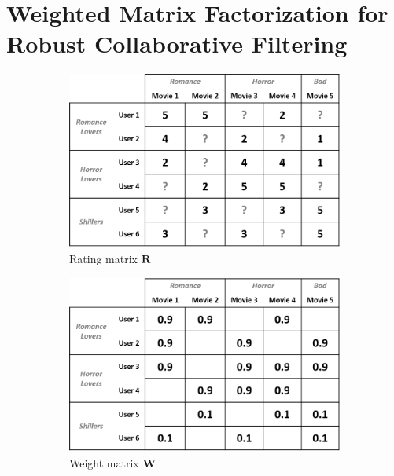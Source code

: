 \documentclass[master,english,final]{kaist-ucs}
\begin{document}
\section{Weighted Matrix Factorization for Robust Collaborative Filtering}
\begin{figure}[b]
    \centering
    \begin{subfigure}[b]{0.3\textwidth}
        \centering
        \includegraphics[width=\textwidth]{figure/mf_after_rating}
        \caption{Rating matrix $\bm{R}$}
    \end{subfigure}
    \begin{subfigure}[b]{0.3\textwidth}
        \centering
        \includegraphics[width=\textwidth]{figure/wmf_good_weight}
        \caption{Weight matrix $\bm{W}$}
        \label{wmf_good_weight}
    \end{subfigure}
    \begin{subfigure}[b]{0.3\textwidth}

\end{subfigure}
\end{figure}
\end{document}
